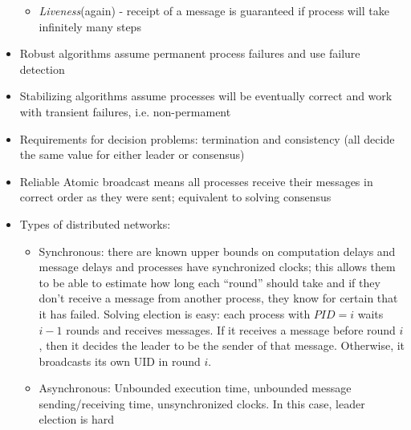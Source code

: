 \documentclass[a4paper,10pt,]{article}
\begin{document}
\begin{itemize}
\begin{itemize}
    \item \emph{Liveness}(again) - receipt of a message is guaranteed if process will take infinitely many steps
  \end{itemize}
  \item Robust algorithms assume permanent process failures and use failure detection
  \item Stabilizing algorithms assume processes will be eventually correct and work with transient failures, i.e. non-permament
  \item Requirements for decision problems: termination and consistency (all decide the same value for either leader or consensus)
  \item Reliable Atomic broadcast means all processes receive their messages in correct order as they were sent; equivalent to solving consensus
  \item Types of distributed networks:
  \begin{itemize}
    \item Synchronous: there are known upper bounds on computation delays and message delays and processes have synchronized clocks;  this allows them to be able to estimate how long each ``round'' should take and if they don't receive a message from another process, they know for certain that it has failed.  Solving election is easy: each process with $PID = i$ waits $i-1$ rounds and receives messages.  If it receives a message before round $i$, then it decides the leader to be the sender of that message.  Otherwise, it broadcasts its own UID in round $i$.
    \item Asynchronous: Unbounded execution time, unbounded message sending/receiving time, unsynchronized clocks.  In this case, leader election is hard
  \end{itemize}
\end{itemize}
\end{document}
